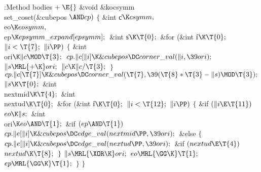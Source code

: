 \Y\B\4:Method bodies\X${}\mathrel+\E{}$\6
\&{void} \&{kocsymm}\DC\\{set\_coset}(\&{cubepos} ${}{\AND}\\{cp}){}$\1\1\2\2\6
${}\{{}$\1\6
\&{int} \|c${}\K\\{csymm},{}$ \\{eo}${}\K\\{eosymm},{}$ \\{ep}${}\K\\{epsymm%
\_expand}[\\{epsymm}];{}$\6
\&{int} \|s${}\K\T{0};{}$\7
\&{for} (\&{int} \|i${}\K\T{0};{}$ ${}\|i<\T{7};{}$ ${}\|i\PP){}$\5
${}\{{}$\1\6
\&{int} \\{ori}${}\K\|c\MOD\T{3};{}$\7
${}\\{cp}.\|c[\|i]\K\&{cubepos}\DC\\{corner\_val}(\|i,\39\\{ori});{}$\6
${}\|s\MRL{+{\K}}\\{ori};{}$\6
${}\|c\K\|c/\T{3};{}$\6
\4${}\}{}$\2\6
${}\\{cp}.\|c[\T{7}]\K\&{cubepos}\DC\\{corner\_val}(\T{7},\39(\T{8}*\T{3}-\|s)%
\MOD\T{3});{}$\6
${}\|s\K\T{0};{}$\7
\&{int} \\{nextmid}${}\K\T{4};{}$\6
\&{int} \\{nextud}${}\K\T{0};{}$\7
\&{for} (\&{int} \|i${}\K\T{0};{}$ ${}\|i<\T{12};{}$ ${}\|i\PP){}$\5
${}\{{}$\1\6
\&{if} ${}(\|i\E\T{11}){}$\1\5
${}\\{eo}\K\|s;{}$\2\7
\&{int} \\{ori}${}\K\\{eo}\AND\T{1};{}$\7
\&{if} ${}(\\{ep}\AND\T{1}){}$\1\5
${}\\{cp}.\|e[\|i]\K\&{cubepos}\DC\\{edge\_val}(\\{nextmid}\PP,\39\\{ori});{}$%
\2\6
\&{else}\5
${}\{{}$\1\6
${}\\{cp}.\|e[\|i]\K\&{cubepos}\DC\\{edge\_val}(\\{nextud}\PP,\39\\{ori});{}$\6
\&{if} ${}(\\{nextud}\E\T{4}){}$\1\5
${}\\{nextud}\K\T{8};{}$\2\6
\4${}\}{}$\2\6
${}\|s\MRL{{\XOR}{\K}}\\{ori};{}$\6
${}\\{eo}\MRL{{\GG}{\K}}\T{1};{}$\6
${}\\{ep}\MRL{{\GG}{\K}}\T{1};{}$\6
\4${}\}{}$\2\6
\4${}\}{}$\2\par
\fi

